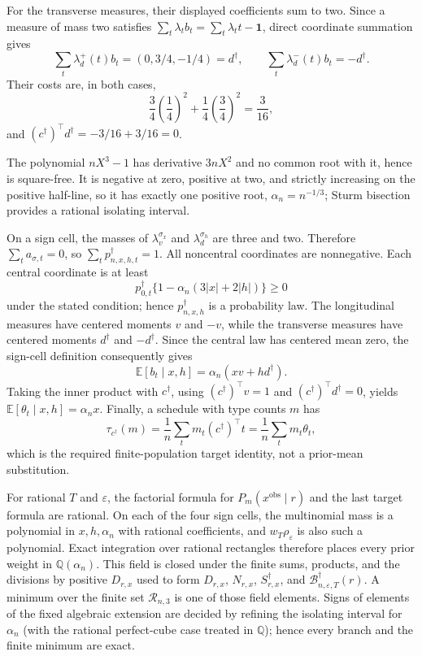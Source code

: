For the transverse measures, their displayed coefficients sum to two.  Since a measure of mass two satisfies \(\sum_t\lambda_tb_t=\sum_t\lambda_tt-\mathbf1\), direct coordinate summation gives
\[
\sum_t\lambda_d^+(t)b_t=(0,3/4,-1/4)=d^\dagger,\qquad
\sum_t\lambda_d^-(t)b_t=-d^\dagger.
\]
Their costs are, in both cases,
\[
\frac34\left(\frac14\right)^2+\frac14\left(\frac34\right)^2
=\frac3{16},
\]
and \((c^\dagger)^\top d^\dagger=-3/16+3/16=0\).

The polynomial \(nX^3-1\) has derivative \(3nX^2\) and no common root with it, hence is square-free.  It is negative at zero, positive at two, and strictly increasing on the positive half-line, so it has exactly one positive root, \(\alpha_n=n^{-1/3}\); Sturm bisection provides a rational isolating interval.

On a sign cell, the masses of \(\lambda_v^{\sigma_x}\) and \(\lambda_d^{\sigma_h}\) are three and two.  Therefore \(\sum_ta_{\sigma,t}=0\), so \(\sum_tp_{n,x,h,t}^\dagger=1\).  All noncentral coordinates are nonnegative.  Each central coordinate is at least
\[
p_{0,t}^\dagger\{1-\alpha_n(3|x|+2|h|)\}\ge0
\]
under the stated condition; hence \(p_{n,x,h}^\dagger\) is a probability law.  The longitudinal measures have centered moments \(v\) and \(-v\), while the transverse measures have centered moments \(d^\dagger\) and \(-d^\dagger\).  Since the central law has centered mean zero, the sign-cell definition consequently gives
\[
\mathbb E[b_t\mid x,h]=\alpha_n(xv+hd^\dagger).
\]
Taking the inner product with \(c^\dagger\), using \((c^\dagger)^\top v=1\) and \((c^\dagger)^\top d^\dagger=0\), yields
\(\mathbb E[\theta_t\mid x,h]=\alpha_nx\).  Finally, a schedule with type counts \(m\) has
\[
\tau_{c^\dagger}(m)=\frac1n\sum_tm_t(c^\dagger)^\top t
=\frac1n\sum_tm_t\theta_t,
\]
which is the required finite-population target identity, not a prior-mean substitution.

For rational \(T\) and \(\varepsilon\), the factorial formula for \(P_m(x^{\mathrm{obs}}\mid r)\) and the last target formula are rational.  On each of the four sign cells, the multinomial mass is a polynomial in \(x,h,\alpha_n\) with rational coefficients, and \(w_T\rho_\varepsilon\) is also such a polynomial.  Exact integration over rational rectangles therefore places every prior weight in \(\mathbb Q(\alpha_n)\).  This field is closed under the finite sums, products, and the divisions by positive \(D_{r,x}\) used to form \(D_{r,x}\), \(N_{r,x}\), \(S_{r,x}^\dagger\), and \(\mathcal B_{n,\varepsilon,T}^\dagger(r)\).  A minimum over the finite set \(\mathcal R_{n,3}\) is one of those field elements.  Signs of elements of the fixed algebraic extension are decided by refining the isolating interval for \(\alpha_n\) (with the rational perfect-cube case treated in \(\mathbb Q\)); hence every branch and the finite minimum are exact.

